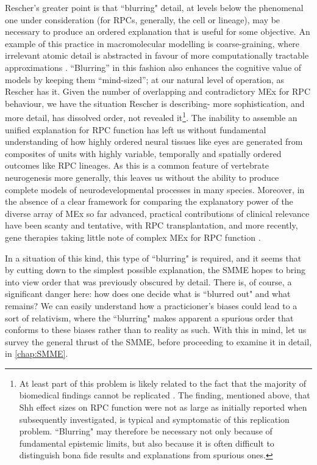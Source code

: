 Rescher's greater point is that ``blurring" detail, at levels below the phenomenal one under consideration (for RPCs, generally, the cell or lineage), may be necessary to produce an ordered explanation that is useful for some objective. An example of this practice in macromolecular modelling is coarse-graining, where irrelevant atomic detail is abstracted in favour of more computationally tractable approximations \cite{Ingolfsson2014}. ``Blurring'' in this fashion also enhances the cognitive value of models by keeping them ``mind-sized''; at our natural level of operation, as Rescher has it. Given the number of overlapping and contradictory MEx for RPC behaviour, we have the situation Rescher is describing- more sophistication, and more detail, has dissolved order, not revealed it\footnote{At least part of this problem is likely related to the fact that the majority of biomedical findings cannot be replicated \cite{Ioannidis2005}. The finding, mentioned above, that Shh effect sizes on RPC function were not as large as initially reported when subsequently investigated, is typical and symptomatic of this replication problem. ``Blurring" may therefore be necessary not only because of fundamental epistemic limits, but also because it is often difficult to distinguish bona fide results and explanations from spurious ones.}. The inability to assemble an unified explanation for RPC function has left us without fundamental understanding of how highly ordered neural tissues like eyes are generated from composites of units with highly variable, temporally and spatially ordered outcomes like RPC lineages. As this is a common feature of vertebrate neurogenesis more generally, this leaves us without the ability to produce complete models of neurodevelopmental processes in many species. Moreover, in the absence of a clear framework for comparing the explanatory power of the diverse array of MEx so far advanced, practical contributions of clinical relevance have been scanty and tentative, with RPC transplantation, and more recently, gene therapies taking little note of complex MEx for RPC function \cite{Coles2004,Gaillard2007,Yao2018}.

In a situation of this kind, this type of ``blurring" is required, and it seems that by cutting down to the simplest possible explanation, the SMME hopes to bring into view order that was previously obscured by detail. There is, of course, a significant danger here: how does one decide what is ``blurred out" and what remains? We can easily understand how a practicioner's biases could lead to a sort of relativism, where the ``blurring" makes apparent a spurious order that conforms to these biases rather than to reality as such. With this in mind, let us survey the general thrust of the SMME, before proceeding to examine it in detail, in \autoref{chap:SMME}.

